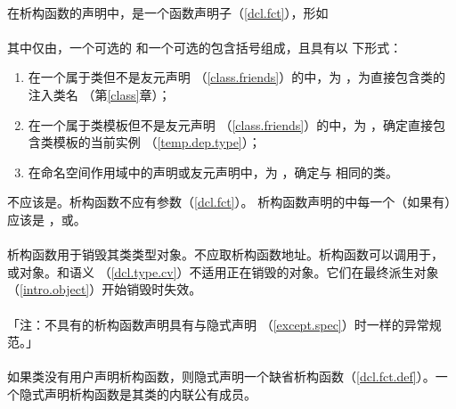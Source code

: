 \paragraph{}
在析构函数的声明中，是一个函数声明子（\ref{dcl.fct}），形如    \\
\mbox{}       \\
其中仅由，一个可选的
和一个可选的包含括号组成，且具有以
下形式：
\begin{enumerate}
  \item{在一个属于类但不是友元声明
    （\ref{class.friends}）的中，为
    \tm{\~}，为直接包含类的注入类名
    （第\ref{class}章）；}
  \item{在一个属于类模板但不是友元声明
    （\ref{class.friends}）的中，为
    \tm{\~}，确定直接包含类模板的当前实例
    （\ref{temp.dep.type}）；}
  \item{在命名空间作用域中的声明或友元声明中，为
     \tm{\~}，确定与
    相同的类。}
\end{enumerate}
不应该是。析构函数不应有参数（\ref{dcl.fct}）。
析构函数声明的中每一个（如果有）应该是
，或。

\paragraph{}
析构函数用于销毁其类类型对象。不应取析构函数地址。析构函数可以调用于，
或对象。和语义
（\ref{dcl.type.cv}）不适用正在销毁的对象。它们在最终派生对象
（\ref{intro.object}）开始销毁时失效。

\paragraph{}
「注：不具有的析构函数声明具有与隐式声明
（\ref{except.spec}）时一样的异常规范。」

\paragraph{}
如果类没有用户声明析构函数，则隐式声明一个缺省析构函数（\ref{dcl.fct.def}）。一
个隐式声明析构函数是其类的内联公有成员。


